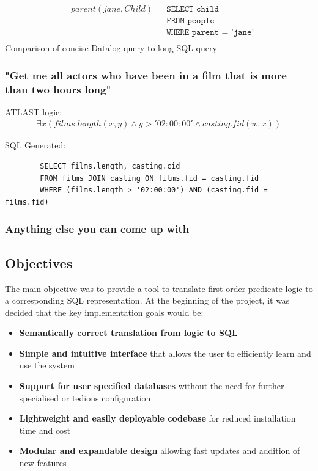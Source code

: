 \documentclass[a4paper, 11pt]{article}
\begin{document}
      \begin{center}
        \begin{align*}
          & parent(jane, Child) & & \texttt{SELECT child} \\
          &                     & & \texttt{FROM people} \\
          &                     & & \texttt{WHERE parent = 'jane'} \\
        \end{align*}
        Comparison of concise Datalog query to long SQL query
      \end{center}

    \subsubsection*{"Get me all actors who have been in a film that is more
      than two hours long"}

      ATLAST logic:
      \begin{gather}
        \exists x(films.length(x, y) \land y>'02:00:00' \land casting.fid(w, x))
      \end{gather}

      SQL Generated:
      \begin{verbatim}
        SELECT films.length, casting.cid
        FROM films JOIN casting ON films.fid = casting.fid
        WHERE (films.length > '02:00:00') AND (casting.fid = films.fid)
      \end{verbatim}

    \subsubsection{Anything else you can come up with}

  \subsection{Objectives}
    The main objective was to provide a tool to translate first-order predicate
    logic to a corresponding SQL representation. At the beginning of the
    project, it was decided that the key implementation goals would be:

    \begin{itemize}
      \item \textbf{Semantically correct translation from logic to SQL}

      \item \textbf{Simple and intuitive interface} that allows the user to
      efficiently learn and use the system

      \item \textbf{Support for user specified databases} without the need for
      further specialised or tedious configuration

      \item \textbf{Lightweight and easily deployable codebase} for reduced
      installation time and cost

      \item \textbf{Modular and expandable design} allowing fast updates and
      addition of new features
    \end{itemize}
\end{document}
